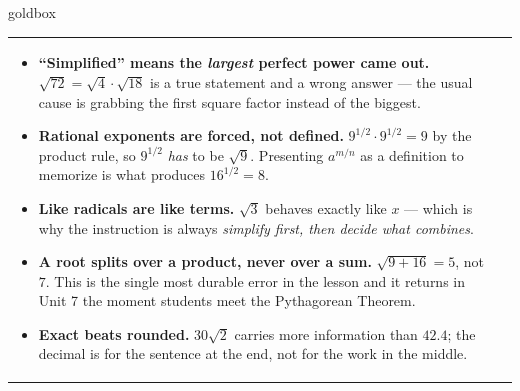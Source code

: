 \documentclass[10pt]{article}
\begin{document}
\begin{skillbox}{goldbox}
\begin{tabularx}{\linewidth}{@{}X|X@{}}
\begin{minipage}[t]{\linewidth}
\begin{itemize}[leftmargin=1.1em, itemsep=2pt, topsep=2pt]
  \item \textbf{``Simplified'' means the \emph{largest} perfect power came out.}
        $\sqrt{72}=\sqrt4\cdot\sqrt{18}$ is a true statement and a wrong answer --- the usual
        cause is grabbing the first square factor instead of the biggest.
  \item \textbf{Rational exponents are forced, not defined.} $9^{1/2}\cdot 9^{1/2}=9$ by the
        product rule, so $9^{1/2}$ \emph{has} to be $\sqrt9$. Presenting $a^{m/n}$ as a
        definition to memorize is what produces $16^{1/2}=8$.
  \item \textbf{Like radicals are like terms.} $\sqrt3$ behaves exactly like $x$ --- which is why
        the instruction is always \emph{simplify first, then decide what combines}.
  \item \textbf{A root splits over a product, never over a sum.} $\sqrt{9+16}=5$, not $7$. This
        is the single most durable error in the lesson and it returns in Unit 7 the moment
        students meet the Pythagorean Theorem.
  \item \textbf{Exact beats rounded.} $30\sqrt2$ carries more information than $42.4$; the
        decimal is for the sentence at the end, not for the work in the middle.
\end{itemize}
\end{minipage}
\end{tabularx}
\end{skillbox}
\end{document}
